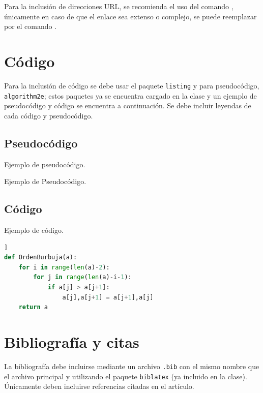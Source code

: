 \documentclass{aleph-revista}
\begin{document}
Para la inclusión de direcciones URL, se recomienda el uso del comando \verb@\url@, únicamente en caso de que el enlace sea extenso o complejo, se puede reemplazar por el comando \verb@\href@.

\section{Código}

Para la inclusión de código se debe usar el paquete \texttt{listing} y para pseudocódigo, \texttt{algorithm2e}; estos paquetes ya se encuentra cargado en la clase y un ejemplo de pseudocódigo y código se encuentra a continuación. Se debe incluir leyendas de cada código y pseudocódigo.

\subsection{Pseudocódigo} 

Ejemplo de pseudocódigo.

\begin{algorithm}[H]
\caption{Ejemplo de Pseudocódigo.}
\end{algorithm}

\subsection{Código}

Ejemplo de código.

\begin{lstlisting}[language=Python,caption={Ejemplo de código.},captionpos=b]]
def OrdenBurbuja(a):
    for i in range(len(a)-2):
        for j in range(len(a)-i-1):
            if a[j] > a[j+1]:
                a[j],a[j+1] = a[j+1],a[j]
    return a
\end{lstlisting}

\section{Bibliografía y citas}

La bibliografía debe incluirse mediante un archivo \texttt{.bib} con el mismo nombre que el archivo principal y utilizando el paquete \texttt{biblatex} (ya incluido en la clase). Únicamente deben incluirse referencias citadas en el artículo.
\end{document}
